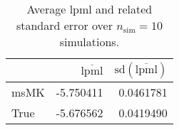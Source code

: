 \begin{table}[H]

\caption{Average lpml and related standard error over $n_{\text{sim}} = 10$ simulations.}
\centering
\begin{tabular}[t]{lrr}
\toprule
  & $\overbar{\text{lpml}}$ & $\text{sd}(\overbar{\text{lpml}})$\\
\midrule
msMK & -5.750411 & 0.0461781\\
True & -5.676562 & 0.0419490\\
\bottomrule
\end{tabular}
\end{table}